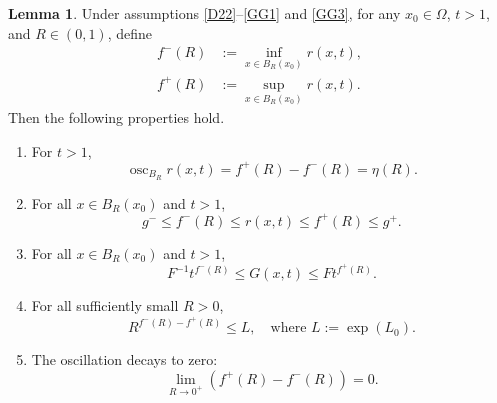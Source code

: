 \documentclass[10pt,reqno]{amsart}
\newcommand *\w{^\wedge}
\theoremstyle{definition}
\newtheorem{lemma}[theorem]{Lemma}
\numberwithin{equation}{section}
\begin{document}
\begin{lemma} \label{lem22}
Under assumptions \eqref{D22}--\eqref{GG1} and \eqref{GG3}, for any $x_0 \in \Omega$, $t > 1$, and $R \in (0,1)$, define
\begin{align*}
f^-(R) &:= \inf_{x \in B_R(x_0)} r(x, t), \\
f^+(R) &:= \sup_{x \in B_R(x_0)} r(x, t).
\end{align*}
Then the following properties hold.
\begin{enumerate}
\item[$(1)$] For $t>1$, $$\operatorname{osc}_{B_R}r(x,t)=f^+(R)-f^-(R)=\eta(R).$$
    \item[$(2)$] For all $x \in B_R(x_0)$ and $t > 1$,
          \[
          g^- \leq f^-(R) \leq r(x, t) \leq f^+(R) \leq g^+.
          \]
    \item[$(3)$] For all $x \in B_R(x_0)$ and $t > 1$,
          \[
          F^{-1} t^{f^-(R)} \leq G(x, t) \leq F t^{f^+(R)}.
          \]
    \item[$(4)$] For all sufficiently small $R > 0$,
          \[
          R^{f^-(R) - f^+(R)} \leq L, \quad \text{where } L := \exp(L_0).
          \]
    \item[$(5)$] The oscillation decays to zero:
          \[
          \lim_{R \to 0^+} \left( f^+(R) - f^-(R) \right) = 0.
          \]
\end{enumerate}
\end{lemma}
\end{document}
